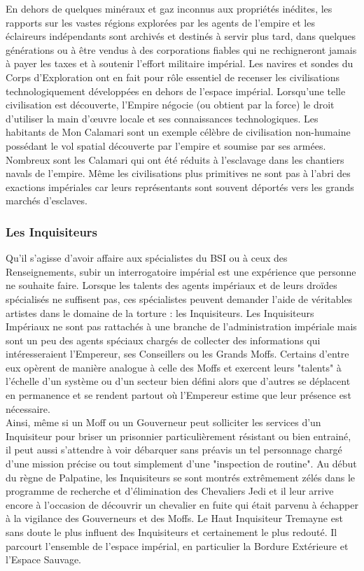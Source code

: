 \documentclass[twoside]{article}
\begin{document}
En dehors de quelques minéraux et gaz inconnus aux propriétés inédites, les rapports sur les vastes régions explorées par les agents de l'empire et les éclaireurs indépendants sont archivés et destinés à servir plus tard, dans quelques générations ou à être vendus à des corporations fiables qui ne rechigneront jamais à payer les taxes et à soutenir l'effort militaire impérial. Les navires et sondes du Corps d'Exploration ont en fait pour rôle essentiel de recenser les civilisations technologiquement développées en dehors de l'espace impérial. Lorsqu'une telle civilisation est découverte, l'Empire négocie (ou obtient par la force) le droit d'utiliser la main d'\oe uvre locale et ses connaissances technologiques. Les habitants de Mon Calamari sont un exemple célèbre de civilisation non-humaine possédant le vol spatial découverte par l'empire et soumise par ses armées. Nombreux sont les Calamari qui ont été réduits à l'esclavage dans les chantiers navals de l'empire. Même les civilisations plus primitives ne sont pas à l'abri des exactions impériales car leurs représentants sont souvent déportés vers les grands marchés d'esclaves.

\subsubsection{Les Inquisiteurs}
Qu'il s'agisse d'avoir affaire aux spécialistes du BSI ou à ceux des Renseignements, subir un interrogatoire impérial est une expérience que personne ne souhaite faire. Lorsque les talents des agents impériaux et de leurs droïdes spécialisés ne suffisent pas, ces spécialistes peuvent demander l'aide de véritables artistes dans le domaine de la torture : les Inquisiteurs. Les Inquisiteurs Impériaux ne sont pas rattachés à une branche de l'administration impériale mais sont un peu des agents spéciaux chargés de collecter des informations qui intéresseraient l'Empereur, ses Conseillers ou les Grands Moffs. Certains d'entre eux opèrent de manière analogue à celle des Moffs et exercent leurs "talents" à l'échelle d'un système ou d'un secteur bien défini alors que d'autres se déplacent en permanence et se rendent partout où l'Empereur estime que leur présence est nécessaire.\\

Ainsi, même si un Moff ou un Gouverneur peut solliciter les services d'un Inquisiteur pour briser un prisonnier particulièrement résistant ou bien entrainé, il peut aussi s'attendre à voir débarquer sans préavis un tel personnage chargé d'une mission précise ou tout simplement d'une "inspection de routine". Au début du règne de Palpatine, les Inquisiteurs se sont montrés extrêmement zélés dans le programme de recherche et d'élimination des Chevaliers Jedi et il leur arrive encore à l'occasion de découvrir un chevalier en fuite qui était parvenu à échapper à la vigilance des Gouverneurs et des Moffs. Le Haut Inquisiteur Tremayne est sans doute le plus influent des Inquisiteurs et certainement le plus redouté. Il parcourt l'ensemble de l'espace impérial, en particulier la Bordure Extérieure et l'Espace Sauvage.
\end{document}
